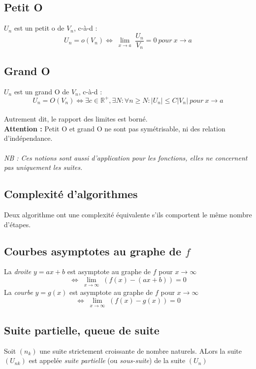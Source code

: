 \documentclass[11pt, a4paper, openany]{book}
\begin{document}
\subsection*{Petit O}
$U_{n}$ est un petit o de $V_{n}$, c-à-d :\\ 
$$U_{n} = o(V_{n}) \Leftrightarrow \lim\limits_{\substack{x \to a}} \frac{U_{n}}{V_{n}} = 0\ pour\ x \rightarrow a$$
\subsection*{Grand O}
$U_{n}$ est un grand O de $V_{n}$, c-à-d :
$$U_{n} = O(V_{n}) \Leftrightarrow \exists c \in \mathbb{R}^{+}, \exists N : \forall n \geq N : |U_{n}| \leq C|V_{n}|\ pour\ x \rightarrow a$$ \\
Autrement dit, le rapport des limites est borné.\\
\textbf{Attention : } Petit O et grand O ne sont pas symétrisable, ni des relation d'indépendance.\\
\\
\textit{NB : Ces notions sont aussi d'application pour les fonctions, elles ne concernent pas uniquement les suites.}

\subsection{Complexité d'algorithmes}
Deux algorithme ont une complexité équivalente s'ils comportent le même nombre d'étapes.

\subsection{Courbes asymptotes au graphe de $f$}
La \textit{droite} $y = ax + b$ est asymptote au graphe de $f$ pour $x \rightarrow \infty$ 
$$ \Leftrightarrow \lim\limits_{\substack{x \to \infty}} (f(x) - (ax+b)) = 0$$
La \textit{courbe} $y=g(x)$ est asymptote au graphe de $f$ pour $x \rightarrow \infty$ 
$$ \Leftrightarrow \lim\limits_{\substack{x \to \infty}} (f(x) - g(x)) = 0$$

\subsection{Suite partielle, queue de suite}
Soit $(n_{k})$ une suite strictement croissante de nombre naturels. ALors la suite $(U_{nk})$ est appelée \textit{suite partielle} (ou \textit{sous-suite}) de la suite $(U_{n})$
\end{document}
